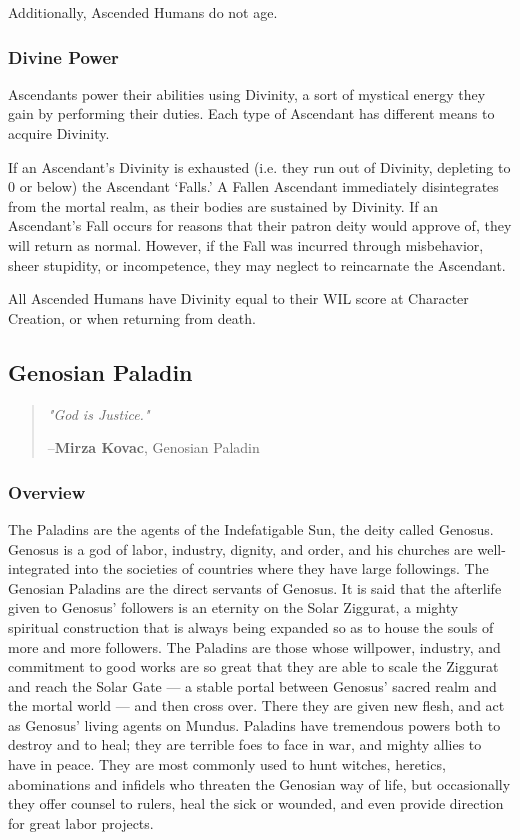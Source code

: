 \documentclass[oneside,11pt,english]{book}
\begin{document}
Additionally, Ascended Humans do not age. 
\subsubsection{Divine Power}
Ascendants power their abilities using Divinity, a sort of mystical energy they gain by performing their 
duties. Each type of Ascendant has different means to acquire Divinity. 


If an Ascendant's Divinity is exhausted (i.e. they run out of Divinity, depleting to 0 or below) the 
Ascendant ‘Falls.’ A Fallen Ascendant immediately disintegrates from the mortal realm, as their bodies 
are sustained by Divinity. If an Ascendant's Fall occurs for reasons that their patron deity would approve 
of, they will return as normal. However, if the Fall was incurred through misbehavior, sheer stupidity, or 
incompetence, they may neglect to reincarnate the Ascendant. 


All Ascended Humans have Divinity equal to their WIL score at Character Creation, or when returning from death. 
\subsection{Genosian Paladin} 
\begin{quote}
\emph{"God is Justice."}

\hfill--\textbf{Mirza Kovac}, Genosian Paladin 
\end{quote}
\subsubsection*{Overview} 
The Paladins are the agents of the Indefatigable Sun, the deity called Genosus. Genosus is a god of labor, 
industry, dignity, and order, and his churches are well-integrated into the societies of countries where they 
have large followings. The Genosian Paladins are the direct servants of Genosus. It is said that the 
afterlife given to Genosus' followers is an eternity on the Solar Ziggurat, a mighty spiritual construction 
that is always being expanded so as to house the souls of more and more followers. The Paladins are those 
whose willpower, industry, and commitment to good works are so great that they are able to scale the 
Ziggurat and reach the Solar Gate — a stable portal between Genosus' sacred realm and the mortal world — and then cross over. There they are given new flesh, and act as Genosus' living agents on Mundus. 
Paladins have tremendous powers both to destroy and to heal; they are terrible foes to face in war, and 
mighty allies to have in peace. They are most commonly used to hunt witches, heretics, abominations and 
infidels who threaten the Genosian way of life, but occasionally they offer counsel to rulers, heal the sick 
or wounded, and even provide direction for great labor projects. 
\end{document}
